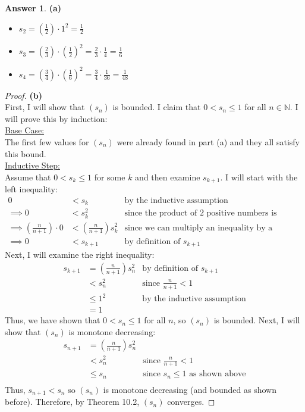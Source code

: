 \documentclass[10pt,a4paper]{article}
\theoremstyle{definition}
\newtheorem*{answer*}{Answer}
\begin{document}
\begin{answer*}{\textbf{(a)}}
\begin{itemize}
\item $\displaystyle s_2 = \left(\frac{1}{2}\right)\cdot 1^2 = \frac{1}{2}$
\item $\displaystyle s_3 = \left(\frac{2}{3}\right)\cdot \left(\frac{1}{2}\right)^2 = \frac{2}{3} \cdot \frac{1}{4} = \frac{1}{6}$
\item $\displaystyle s_4 = \left(\frac{3}{4}\right)\cdot \left(\frac{1}{6}\right)^2 = \frac{3}{4} \cdot \frac{1}{36} = \frac{1}{48} $
\end{itemize}
\end{answer*}

\begin{proof}{\textbf{(b)}}
\\First, I will show that $(s_n)$ is bounded. I claim that $0 < s_n \leq 1$ for all $n \in \mathbb{N}$. I will prove this by induction:
\\\underline{Base Case:}
\\The first few values for $(s_n)$ were already found in part (a) and they all satisfy this bound.
\\\underline{Inductive Step:}
\\Assume that $0 < s_k \leq 1$ for some $k$ and then examine $s_{k+1}$. I will start with the left inequality:
\begin{align*}
0 &< s_k &\text{by the inductive assumption}\\
\implies 0 &< s_k^2 &\text{since the product of 2 positive numbers is positive}\\
\implies \left(\frac{n}{n+1}\right) \cdot 0 &< \left(\frac{n}{n+1}\right) s_k^2 &\text{since we can multiply an inequality by a positive number}\\
\implies 0 &< s_{k+1} &\text{by definition of $s_{k+1}$}
\end{align*}
Next, I will examine the right inequality:
\begin{align*}
s_{k+1} &= \left(\frac{n}{n+1}\right) s_n^2 &\text{by definition of $s_{k+1}$}\\
&< s_n^2 &\text{since $\frac{n}{n+1} < 1$}\\
&\leq 1^2 &\text{by the inductive assumption}\\
&= 1
\end{align*}
Thus, we have shown that $0 < s_n \leq 1$ for all $n$, so $(s_n)$ is bounded. Next, I will show that $(s_n)$ is monotone decreasing:
\begin{align*}
s_{n + 1} &= \left(\frac{n}{n+1}\right) s_n^2\\
&< s_n^2 &\text{since $\frac{n}{n+1} < 1$}\\
&\leq s_n &\text{since $s_n \leq 1$ as shown above}\\
\end{align*}
Thus, $s_{n+1} < s_n$ so $(s_n)$ is monotone decreasing (and bounded as shown before). Therefore, by Theorem 10.2, $(s_n)$ converges. 
\end{proof}
\end{document}
